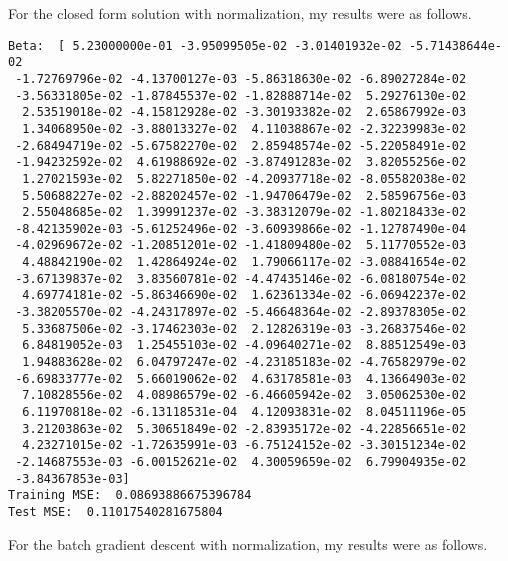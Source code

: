 \documentclass[12pt]{article}
\begin{document}
For the closed form solution with normalization, my results were as follows.
\scriptsize
\begin{verbatim}
Beta:  [ 5.23000000e-01 -3.95099505e-02 -3.01401932e-02 -5.71438644e-02
 -1.72769796e-02 -4.13700127e-03 -5.86318630e-02 -6.89027284e-02
 -3.56331805e-02 -1.87845537e-02 -1.82888714e-02  5.29276130e-02
  2.53519018e-02 -4.15812928e-02 -3.30193382e-02  2.65867992e-03
  1.34068950e-02 -3.88013327e-02  4.11038867e-02 -2.32239983e-02
 -2.68494719e-02 -5.67582270e-02  2.85948574e-02 -5.22058491e-02
 -1.94232592e-02  4.61988692e-02 -3.87491283e-02  3.82055256e-02
  1.27021593e-02  5.82271850e-02 -4.20937718e-02 -8.05582038e-02
  5.50688227e-02 -2.88202457e-02 -1.94706479e-02  2.58596756e-03
  2.55048685e-02  1.39991237e-02 -3.38312079e-02 -1.80218433e-02
 -8.42135902e-03 -5.61252496e-02 -3.60939866e-02 -1.12787490e-04
 -4.02969672e-02 -1.20851201e-02 -1.41809480e-02  5.11770552e-03
  4.48842190e-02  1.42864924e-02  1.79066117e-02 -3.08841654e-02
 -3.67139837e-02  3.83560781e-02 -4.47435146e-02 -6.08180754e-02
  4.69774181e-02 -5.86346690e-02  1.62361334e-02 -6.06942237e-02
 -3.38205570e-02 -4.24317897e-02 -5.46648364e-02 -2.89378305e-02
  5.33687506e-02 -3.17462303e-02  2.12826319e-03 -3.26837546e-02
  6.84819052e-03  1.25455103e-02 -4.09640271e-02  8.88512549e-03
  1.94883628e-02  6.04797247e-02 -4.23185183e-02 -4.76582979e-02
 -6.69833777e-02  5.66019062e-02  4.63178581e-03  4.13664903e-02
  7.10828556e-02  4.08986579e-02 -6.46605942e-02  3.05062530e-02
  6.11970818e-02 -6.13118531e-04  4.12093831e-02  8.04511196e-05
  3.21203863e-02  5.30651849e-02 -2.83935172e-02 -4.22856651e-02
  4.23271015e-02 -1.72635991e-03 -6.75124152e-02 -3.30151234e-02
 -2.14687553e-03 -6.00152621e-02  4.30059659e-02  6.79904935e-02
 -3.84367853e-03]
Training MSE:  0.08693886675396784
Test MSE:  0.11017540281675804
\end{verbatim}
\normalsize
For the batch gradient descent with normalization, my results were as follows.
\scriptsize
\end{document}
